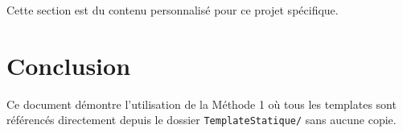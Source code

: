 Cette section est du contenu personnalisé pour ce projet spécifique.





\section{Conclusion}

Ce document démontre l'utilisation de la Méthode 1 où tous les templates sont référencés directement depuis le dossier \texttt{TemplateStatique/} sans aucune copie.

